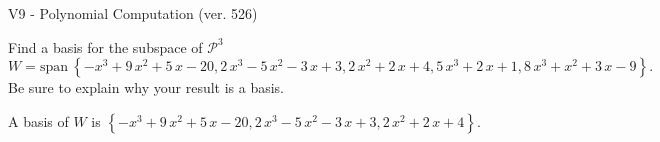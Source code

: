 \begin{exercise}
  \begin{exerciseTitle}V9 - Polynomial Computation (ver. 526)\end{exerciseTitle}
  \begin{exerciseStatement}
    Find a basis for the subspace of \(\mathcal{P}^3\) 
\[W=\mathrm{span}\ \left\{-x^{3} + 9 \, x^{2} + 5 \, x - 20 , 2 \, x^{3} - 5 \, x^{2} - 3 \, x + 3 , 2 \, x^{2} + 2 \, x + 4 , 5 \, x^{3} + 2 \, x + 1 , 8 \, x^{3} + x^{2} + 3 \, x - 9\right\}.\]
 Be sure to explain why your result is a basis.


  \end{exerciseStatement}
  \begin{exerciseAnswer}
   A basis of \(W\) is  \(\left\{-x^{3} + 9 \, x^{2} + 5 \, x - 20 , 2 \, x^{3} - 5 \, x^{2} - 3 \, x + 3 , 2 \, x^{2} + 2 \, x + 4\right\}\).
  


  \end{exerciseAnswer}
\end{exercise}